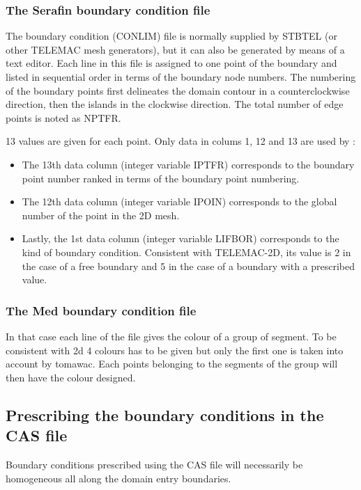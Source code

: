  \subsubsection{The Serafin boundary condition file}
\label{se:BCfile}
The boundary condition (CONLIM) file is normally supplied by STBTEL (or other TELEMAC mesh generators), but it can also be generated
by means of a text editor. Each line in this file is assigned to one point of the boundary and listed in sequential order in terms of
the boundary node numbers. The numbering of the boundary points first delineates the domain contour in a counterclockwise direction,
then the islands in the
clockwise direction. The total number of edge points is noted as NPTFR.

 13 values are given for each point. Only data in colums 1, 12 and 13 are used by \tomawac:

\begin{itemize}
\item The 13th data column (integer variable IPTFR) corresponds to the boundary point number ranked in terms of the boundary point
  numbering.
\item The 12th data column (integer variable IPOIN) corresponds to the global number of the point in the 2D mesh.
\item Lastly, the 1st data column (integer variable LIFBOR) corresponds to the kind of boundary condition. Consistent with TELEMAC-2D,
  its  value is 2 in the case of a free boundary and 5 in the case of a boundary with a prescribed value.
\end{itemize}

\subsubsection{The Med boundary condition file}
In that case each line of the file gives the colour of a group of segment. To be consistent with \telemac2d 4 colours has to be given
but only the first one is taken into account by tomawac. Each points belonging to the segments of the group will then have the colour
designed. 


\subsection{ Prescribing the boundary conditions in the CAS file}

 Boundary conditions prescribed using the CAS file will necessarily be homogeneous all along the domain entry boundaries.

